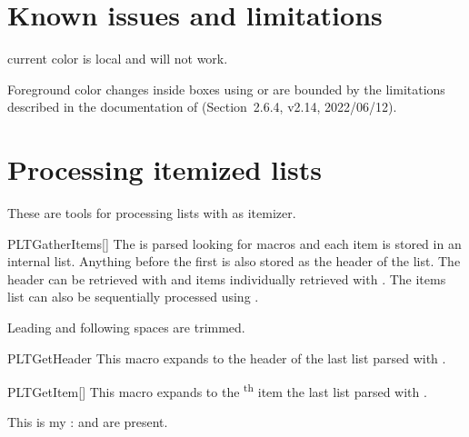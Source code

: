 \documentclass[a4paper, 11pt]{article}
\begin{document}
\section{Known issues and limitations}\label{sec:known-issues-and-limitations}

\begin{descriptiondescription}
    \item[\PackageName{pgffor}] current color is local and \latexinline{\foreach} will not work.
    \item[] Foreground color changes inside boxes using  or  are bounded by the limitations described in the documentation of  (Section~2.6.4,  v2.14, 2022/06/12).
\end{descriptiondescription}

\clearpage
\appendix


\section{Processing itemized lists}\label{sec:getitems}
These are tools for processing lists with  as itemizer.

\begin{macro}{PLTGatherItems}[]
    The  is parsed looking for  macros and each item is stored in an internal list. Anything before the first  is also stored as the header of the list. The header can be retrieved with  and items individually retrieved with . The items list can also be sequentially processed using .

    Leading and following spaces are trimmed.
\end{macro}

\begin{macro}{PLTGetHeader}
    This macro expands to the header of the last list parsed with .
\end{macro}

\begin{macro}{PLTGetItem}[]
    This macro expands to the \textsuperscript{th} item the last list parsed with .
\end{macro}

\begin{tcblisting}{}

    This is my \PLTGetHeader:  and  are present.
\end{tcblisting}
\end{document}
